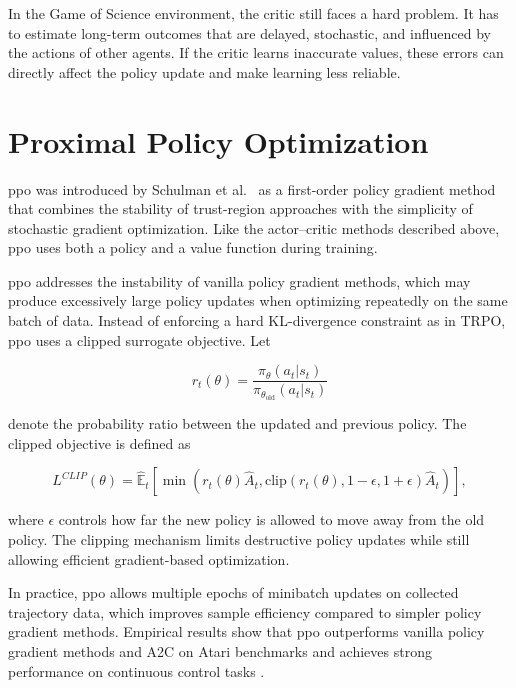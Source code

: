 \documentclass[english,bachelor]{hsluthesis}
\begin{document}
In the Game of Science environment, the critic still faces a hard problem. It has to estimate long-term outcomes that are delayed, stochastic, and influenced by the actions of other agents. If the critic learns inaccurate values, these errors can directly affect the policy update and make learning less reliable.

\section{Proximal Policy Optimization}

\gls{ppo} was introduced by Schulman et al.~\cite{schulman2017proximalpolicyoptimizationalgorithms} as a first-order policy gradient method that combines the stability of trust-region approaches with the simplicity of stochastic gradient optimization. Like the actor--critic methods described above, \gls{ppo} uses both a policy and a value function during training.

\gls{ppo} addresses the instability of vanilla policy gradient methods, which may produce excessively large policy updates when optimizing repeatedly on the same batch of data. Instead of enforcing a hard KL-divergence constraint as in TRPO, \gls{ppo} uses a clipped surrogate objective. Let

\begin{equation}
r_t(\theta) =
\frac{\pi_\theta(a_t|s_t)}{\pi_{\theta_{\text{old}}}(a_t|s_t)}
\end{equation}

denote the probability ratio between the updated and previous policy. The clipped objective is defined as

\begin{equation}
L^{CLIP}(\theta) =
\hat{\mathbb{E}}_t \left[
\min \left(
r_t(\theta)\hat{A}_t,
\text{clip}(r_t(\theta), 1-\epsilon, 1+\epsilon)\hat{A}_t
\right)
\right],
\end{equation}

where $\epsilon$ controls how far the new policy is allowed to move away from the old policy. The clipping mechanism limits destructive policy updates while still allowing efficient gradient-based optimization.

In practice, \gls{ppo} allows multiple epochs of minibatch updates on collected trajectory data, which improves sample efficiency compared to simpler policy gradient methods. Empirical results show that \gls{ppo} outperforms vanilla policy gradient methods and A2C on Atari benchmarks and achieves strong performance on continuous control tasks \cite{schulman2017proximalpolicyoptimizationalgorithms}.
\end{document}

